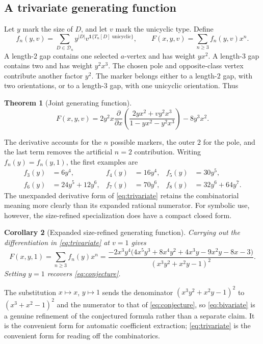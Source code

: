 \documentclass[11pt,letterpaper]{article}
\numberwithin{equation}{section}
\newtheorem{theorem}{Theorem}[section]
\newtheorem{corollary}[theorem]{Corollary}
\theoremstyle{definition}
\newcommand{\CM}{\mathcal D}
\newcommand{\1}{\mathbf 1}
\begin{document}
\subsection{A trivariate generating function}
Let $y$ mark the size of $D$, and let $v$ mark the unicyclic type. Define
\begin{equation}\label{eq:Fdef}
 f_n(y,v)=\sum_{D\in\CM_n}y^{|D|}v^{\1\{T_n[D]\text{ unicyclic}\}},
 \qquad F(x,y,v)=\sum_{n\ge3}f_n(y,v)x^n.
\end{equation}
A length-$2$ gap contains one selected $a$-vertex and has weight $yx^2$.
A length-$3$ gap contains two and has weight $y^2x^3$. The chosen pole and
opposite-class vertex contribute another factor $y^2$.
The marker belongs either to a length-$2$ gap, with two orientations, or to a
length-$3$ gap, with one unicyclic orientation. Thus
\begin{theorem}[Joint generating function]\label{thm:trivariate}
\begin{equation}\label{eq:trivariate}
 \boxed{F(x,y,v)=2y^2x\frac{\partial}{\partial x}
 \left(\frac{2yx^2+v y^2x^3}{1-yx^2-y^2x^3}\right)-8y^3x^2.}
\end{equation}
\end{theorem}
The derivative accounts for the $n$ possible markers, the outer $2$ for the
pole, and the last term removes the artificial $n=2$ contribution.
Writing $f_n(y)=f_n(y,1)$, the first examples are
\begin{align*}
 f_3(y)&=6y^4,& f_4(y)&=16y^4,& f_5(y)&=30y^5,\\
 f_6(y)&=24y^5+12y^6,& f_7(y)&=70y^6,&
 f_8(y)&=32y^6+64y^7.
\end{align*}
The unexpanded derivative form of \eqref{eq:trivariate} retains the combinatorial
meaning more clearly than its expanded rational numerator. For symbolic use,
however, the size-refined specialization does have a compact closed form.

\begin{corollary}[Expanded size-refined generating function]\label{cor:bivariate}
Carrying out the differentiation in \eqref{eq:trivariate} at $v=1$ gives
\begin{equation}\label{eq:bivariate}
 F(x,y,1)=\sum_{n\ge3}f_n(y)x^n
 =\frac{-2x^3y^4\bigl(4x^5y^3+8x^4y^2+4x^3y-9x^2y-8x-3\bigr)}
        {(x^3y^2+x^2y-1)^2}.
\end{equation}
Setting $y=1$ recovers \eqref{eq:conjecture}.
\end{corollary}
The substitution $x\mapsto x$, $y\mapsto1$ sends the denominator
$(x^3y^2+x^2y-1)^2$ to $(x^3+x^2-1)^2$ and the numerator to that of
\eqref{eq:conjecture}, so \eqref{eq:bivariate} is a genuine refinement of the
conjectured formula rather than a separate claim. It is the convenient form for
automatic coefficient extraction; \eqref{eq:trivariate} is the convenient form
for reading off the combinatorics.
\end{document}

